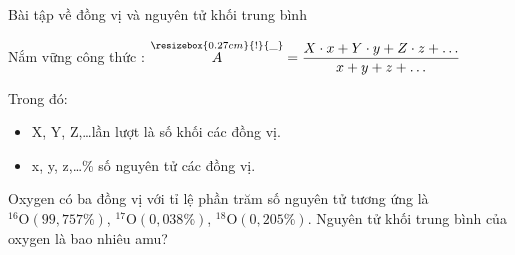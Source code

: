 \begin{dang}{Bài tập về đồng vị và nguyên tử khối trung bình}\end{dang}
\begin{pp}
	Nắm vững công thức : $\overset{\resizebox{0.27cm}{!}{\_}}{A} = \dfrac{X\cdot x+ Y\cdot y + Z\cdot z + \ldots}{x+ y + z +\ldots}$
	
	Trong đó:
	\begin{itemize}
		\item X, Y, Z,\ldots lần lượt là số khối các đồng vị.
		\item x, y, z,\ldots \% số nguyên tử các đồng vị.
	\end{itemize}
\end{pp}
\hienthiloigiaivd
\begin{vd}
	Oxygen có ba đồng vị với tỉ lệ phần trăm số nguyên tử tương ứng là ${}^{16}\mathrm{O}(99{,}757\%)$, ${}^{17}\mathrm{O}(0{,}038\%)$, ${}^{18}\mathrm{O}(0{,}205\%)$. Nguyên tử khối trung bình của oxygen là bao nhiêu amu?
\end{vd}

